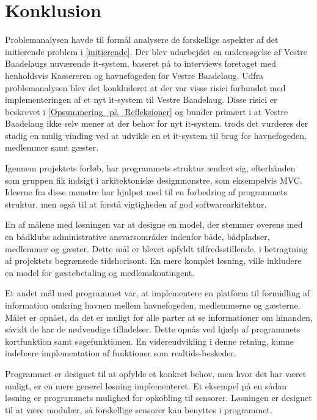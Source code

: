 \chapter{Konklusion}
\label{cha:konklusion}

Problemanalysen havde til formål analysere de forskellige aspekter af det initierende problem i \cref{initierende}. Der blev udarbejdet en undersøgelse af Vestre Baadelaugs nuværende it-system, baseret på to interviews foretaget med henholdsvis Kassereren og havnefogeden for Vestre Baadelaug. Udfra problemanalysen blev det konkluderet at der var visse risici forbundet med implementeringen af et nyt it-system til Vestre Baadelaug. Disse risici er beskrevet i \cref{Opsummering_på_Refleksioner} og bunder primært i at Vestre Baadelaug ikke selv mener at der behov for nyt it-system. 
trods det vurderes der stadig en mulig vinding ved at udvikle en et it-system til brug for havnefogeden, medlemmer samt gæster.  

Igennem projektets forløb, har programmets struktur ændret sig, efterhånden som gruppen fik indsigt i arkitektoniske designmønstre, som eksempelvis MVC. Ideerne fra disse mønstre har hjulpet med til en forbedring af programmets struktur, men også til at forstå vigtigheden af god softwarearkitektur.

En af målene med løsningen var at designe en model, der stemmer overens med en bådklubs administrative ansvarsområder indenfor både, bådpladser, medlemmer og gæster. Dette mål er blevet opfyldt tilfredsstillende, i betragtning af projektets begrænsede tidshorisont. En mere komplet løsning, ville inkludere en model for gæstebetaling og medlemskontingent.

Et andet mål med programmet var, at implementere en platform til formidling af information omkring havnen mellem havnefogeden, medlemmerne og gæsterne. Målet er opnået, da det er muligt for alle parter at se informationer om hinanden, såvidt de har de nødvendige tilladelser. Dette opnås ved hjælp af programmets kortfunktion samt søgefunktionen. En videreudvikling i denne retning, kunne indebære implementation af funktioner som realtids-beskeder.

Programmet er designet til at opfylde et konkret behov, men hvor det har været muligt, er en mere generel løsning implementeret. Et eksempel på en sådan løsning er programmets mulighed for opkobling til sensorer. Løsningen er designet til at være modulær, så forskellige sensorer kan benyttes i programmet.





